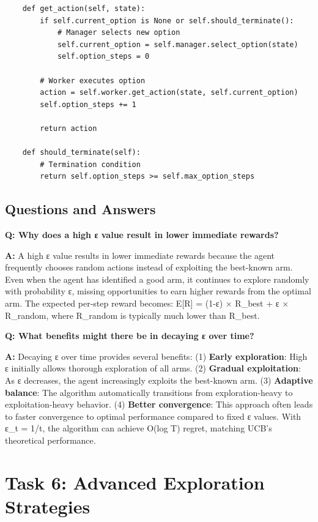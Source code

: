 \documentclass[12pt]{article}
\begin{document}
{{{\begin{verbatim}
    def get_action(self, state):
        if self.current_option is None or self.should_terminate():
            # Manager selects new option
            self.current_option = self.manager.select_option(state)
            self.option_steps = 0
            
        # Worker executes option
        action = self.worker.get_action(state, self.current_option)
        self.option_steps += 1
        
        return action
        
    def should_terminate(self):
        # Termination condition
        return self.option_steps >= self.max_option_steps
\end{verbatim}

\subsection{Questions and Answers}

\textbf{Q: Why does a high ε value result in lower immediate rewards?}

\textbf{A:} A high ε value results in lower immediate rewards because the agent frequently chooses random actions instead of exploiting the best-known arm. Even when the agent has identified a good arm, it continues to explore randomly with probability ε, missing opportunities to earn higher rewards from the optimal arm. The expected per-step reward becomes: E[R] = (1-ε) × R_best + ε × R_random, where R_random is typically much lower than R_best.

\textbf{Q: What benefits might there be in decaying ε over time?}

\textbf{A:} Decaying ε over time provides several benefits: (1) \textbf{Early exploration}: High ε initially allows thorough exploration of all arms. (2) \textbf{Gradual exploitation}: As ε decreases, the agent increasingly exploits the best-known arm. (3) \textbf{Adaptive balance}: The algorithm automatically transitions from exploration-heavy to exploitation-heavy behavior. (4) \textbf{Better convergence}: This approach often leads to faster convergence to optimal performance compared to fixed ε values. With ε_t = 1/t, the algorithm can achieve O(log T) regret, matching UCB's theoretical performance.

\section{Task 6: Advanced Exploration Strategies}

}}}
\end{document}
